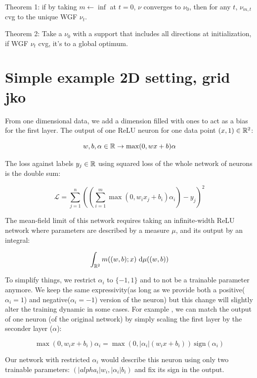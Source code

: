 Theorem 1: if by taking $m \leftarrow \inf$ at $t=0$, $\nu$ converges to $\nu_0$, then for any $t$, $\nu_{m, t}$ cvg to the unique WGF $\nu_t$.

Theorem 2: Take a $\nu_0$ with a support that includes all directions at initialization, if WGF $\nu_t$ cvg, it's to a global optimum.


\section{Simple example 2D setting, grid jko}

From one dimensional data, we add a dimension filled with ones to act as a bias for the first layer. The output of one ReLU neuron for one data point $(x, 1) \in \mathbb{R}^2$:

\begin{equation}
	w, b, \alpha \in \mathbb{R} \rightarrow \max(0, w x + b) \alpha
\end{equation}

The loss against labels $y_j \in \mathbb{R}$ using squared loss of the whole network of neurons is the double sum:

\begin{equation}
	 \mathcal{L} = \sum_{j=1}^n \left(\left(\sum_{i=1}^m \max(0, w_i x_j + b_i) \alpha_i \right)  - y_j \right)^2
\end{equation}

The mean-field limit of this network requires taking an infinite-width ReLU network where parameters are described by a measure $\mu$, and its output by an integral:

\begin{equation}
	\int_{\mathbb{R}^2} m((w, b); x) ~ \mathrm{d} \mu((w, b))
\end{equation}
 
To simplify things, we restrict $\alpha_i$ to $\{-1, 1\}$ and to not be a trainable parameter anymore. We keep the same expressivity(as long as we provide both a positive($\alpha_i=1$) and negative($\alpha_i=-1$) version of the neuron) but this change will slightly alter the training dynamic in some cases. For example , we can match the output of one neuron (of the original network) by simply scaling the first layer by the seconder layer ($\alpha$):

\begin{equation}
	\max(0, w_i x + b_i) \alpha_i = \max\left(0, |\alpha_i|(w_i x + b_i)\right) \ \text{sign}(\alpha_i)
\end{equation}

Our network with restricted $\alpha_i$ would describe this neuron using only two trainable parameters: $(|alpha_i| w_i, |\alpha_i| b_i)$ and fix its sign in the output.

